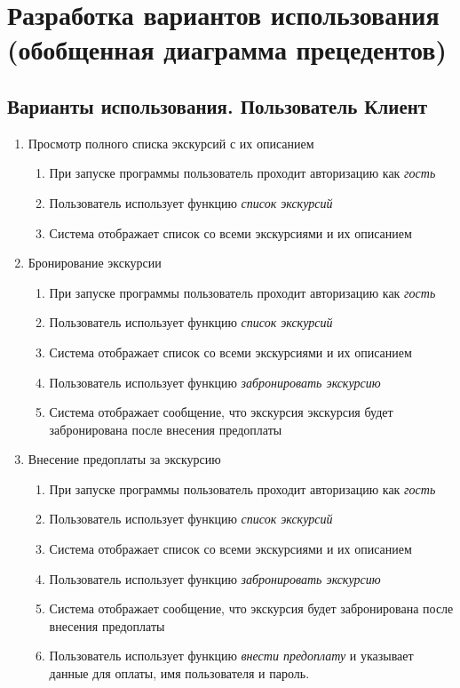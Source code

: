 \documentclass[12pt,a4paper]{article}
\begin{document}
\section{Разработка вариантов использования (обобщенная диаграмма прецедентов)}
\subsection{Варианты использования. Пользователь Клиент}
\begin{enumerate}
\item Просмотр полного списка экскурсий с их описанием
\begin{enumerate}
\item При запуске программы пользователь проходит авторизацию как \textit{гость}
\item Пользователь использует функцию \textit{список экскурсий}
\item Система отображает список со всеми экскурсиями и их описанием
\end{enumerate}
\item Бронирование экскурсии
\begin{enumerate}
\item При запуске программы пользователь проходит авторизацию как \textit{гость}
\item Пользователь использует функцию \textit{список экскурсий}
\item Система отображает список со всеми экскурсиями и их описанием
\item Пользователь использует функцию \textit{забронировать экскурсию}
\item Система отображает сообщение, что экскурсия экскурсия будет забронирована после внесения предоплаты
\end{enumerate}
\item Внесение предоплаты за экскурсию
\begin{enumerate}
\item При запуске программы пользователь проходит авторизацию как \textit{гость}
\item Пользователь использует функцию \textit{список экскурсий}
\item Система отображает список со всеми экскурсиями и их описанием
\item Пользователь использует функцию \textit{забронировать экскурсию}
\item Система отображает сообщение, что экскурсия будет забронирована после внесения предоплаты
\item Пользователь использует функцию \textit{внести предоплату} и указывает данные для оплаты, имя пользователя и пароль.

\end{enumerate}
\end{enumerate}
\end{document}
